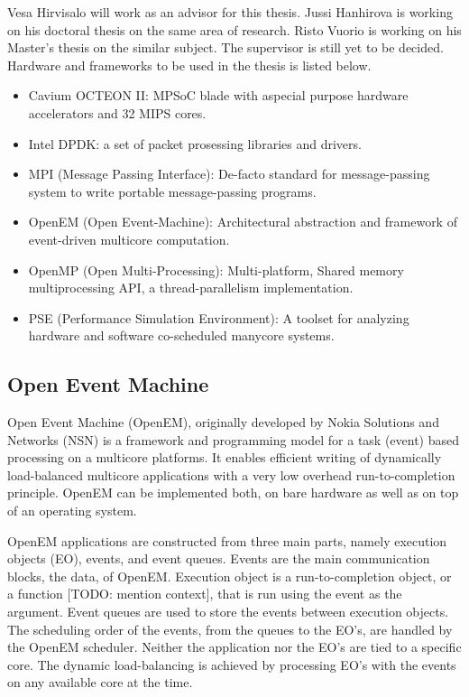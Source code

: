 Vesa Hirvisalo will work as an advisor for this thesis. Jussi Hanhirova is working on his doctoral thesis on the same area of research. Risto Vuorio is working on his Master's thesis on the similar subject. The supervisor is still yet to be decided. Hardware and frameworks to be used in the thesis is listed below.

\begin{itemize}
\item Cavium OCTEON II: MPSoC blade with aspecial purpose hardware accelerators and 32 MIPS cores.

\item Intel DPDK: a set of packet prosessing libraries and drivers.

\item MPI (Message Passing Interface): De-facto standard for message-passing system to write portable message-passing programs.

\item OpenEM (Open Event-Machine): Architectural abstraction and framework of event-driven multicore computation.

\item OpenMP (Open Multi-Processing): Multi-platform, Shared memory multiprocessing API, a thread-parallelism implementation.

\item PSE (Performance Simulation Environment): A toolset for analyzing hardware and software co-scheduled manycore systems.
\end{itemize}

\subsection{Open Event Machine}
Open Event Machine (OpenEM), originally developed by Nokia Solutions and Networks (NSN) is a framework and programming model for a task (event) based processing on a multicore platforms. It enables efficient writing of dynamically load-balanced multicore applications with a very low overhead run-to-completion principle. OpenEM can be implemented both, on bare hardware as well as on top of an operating system.

OpenEM applications are constructed from three main parts, namely execution objects (EO), events, and event queues. Events are the main communication blocks, the data, of OpenEM. Execution object is a run-to-completion object, or a function [TODO: mention context], that is run using the event as the argument. Event queues are used to store the events between execution objects. The scheduling order of the events, from the queues to the EO's, are handled by the OpenEM scheduler. Neither the application nor the EO's are tied to a specific core. The dynamic load-balancing is achieved by processing EO's with the events on any available core at the time.

